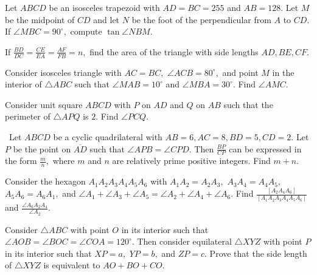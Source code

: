 \documentclass{article}
\begin{document}
    \begin{prob}[HMMT 2019]{6}
Let $ABCD$ be an isosceles trapezoid with $AD=BC= 255$ and $AB= 128.$ Let $M$ be the midpoint of $CD$ and let $N$ be the foot of the perpendicular from $A$ to $CD.$ If $\angle MBC= 90^{\circ},$ compute $\tan\angle NBM.$
\end{prob}
    
    \begin{prob}[]{6}
If $\frac{BD}{DC}=\frac{CE}{EA}=\frac{AF}{FB}=n,$ find the area of the triangle with side lengths $AD,BE,CF.$
\end{prob}

    \begin{prob}[China]{6}
Consider $\triangle BAC$ such that $\angle A=45^{\circ}.$ Let $H$ be the foot of the $A$ altitude. If $BH=2$ and $CH=3,$ find $[ABC].$}
\end{prob}

	 \begin{prob}[]{6}
     Consider isosceles triangle with $AC=BC,$ $\angle ACB=80^{\circ},$ and point $M$ in the interior of $\triangle ABC$ such that $\angle MAB=10^{\circ}$ and $\angle MBA=30^{\circ}.$ Find $\angle AMC.$
\end{prob}
    
    \begin{prob}[]{6}
 Consider unit square $ABCD$ with $P$ on $AD$ and $Q$ on $AB$ such that the perimeter of $\triangle APQ$ is $2.$ Find $\angle PCQ.$
\end{prob}

    \begin{prob}[CIME 2020]{9}
\ Let $ABCD$ be a cyclic quadrilateral with $AB=6,AC=8,BD=5,CD=2.$ Let $P$ be the point on $\overline{AD}$ such that $\angle APB=\angle CPD.$ Then $\frac{BP}{CP}$ can be expressed in the form $\frac{m}{n},$ where $m$ and $n$ are relatively prime positive integers. Find $m+n.$
\end{prob}
    
    \begin{prob}[]{9}
Consider the hexagon $A_1A_2A_3A_4A_5A_6$ with $A_1A_2=A_2A_3,$ $A_3A_4=A_4A_5,$ $A_5A_6=A_6A_1,$ and $\angle A_1+\angle A_3+\angle A_5 = \angle A_2+\angle A_4+\angle A_6.$ Find $\frac{[A_2A_4A_6]}{[A_1A_2A_3A_4A_5A_6]}$ and $\frac{\angle A_6A_2A_4}{\angle A_2}.$
\end{prob}
    
	 \begin{prob}[]{9}
     Consider $\triangle ABC$ with point $O$ in its interior such that $\angle AOB=\angle BOC=\angle COA=120^{\circ}.$ Then consider equilateral $\triangle XYZ$ with point $P$ in its interior such that $XP=a,$ $YP=b,$ and $ZP=c.$ Prove that the side length of $\triangle XYZ$ is equivalent to $AO+BO+CO.$
    \end{prob}
    
\end{document}
